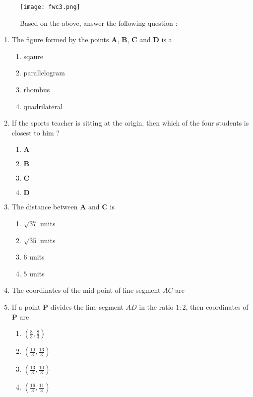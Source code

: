 \documentclass{article}
\let\vec\mathbf
\begin{document}
\begin{enumerate}
	     \begin{figure}[ht]
		     \centering
		     \texttt{[image: fwc3.png]}
		     \caption{Based on the above, answer the following question :}
		     \label{fig:my_label}
	     \end{figure}
\begin{enumerate}[label=(\roman*)]
	\item The figure formed by the points $\vec{A}$, $\vec{B}$, $\vec{C}$ and $\vec{D}$ is a
		\begin{enumerate}[label=(\Alph*)]
			\item sqaure
			\item parallelogram
			\item rhombus
			\item quadrilateral
		\end{enumerate}
	\item If the sports teacher is sitting at the origin, then which of the four students is closest to him ?
		\begin{enumerate}[label=(\Alph*)]
			\item $\vec{A}$
			\item $\vec{B}$
			\item $\vec{C}$
			\item $\vec{D}$
		\end{enumerate}
	\item The distance between $\vec{A}$ and $\vec{C}$ is 
		\begin{enumerate}[label=(\Alph*)]
			\item $\sqrt{37}$ units
			\item $\sqrt{35}$ units
			\item $6$ units
			\item $5$ units
		\end{enumerate}
	\item The coordinates of the mid-point of line segment $AC$ are
	\item If a point $\vec{P}$ divides the line segment $AD$ in the ratio $1:2$, then coordinates of $\vec{P}$ are
		\begin{enumerate}[label=(\Alph*)]
			\item $(\frac{8}{3},\frac{8}{3})$
			\item $(\frac{10}{3},\frac{13}{3})$
			\item $(\frac{13}{3},\frac{10}{3})$
			\item $(\frac{16}{3},\frac{11}{3})$
	\end{enumerate}


\end{enumerate}
\end{enumerate}
\end{document}

